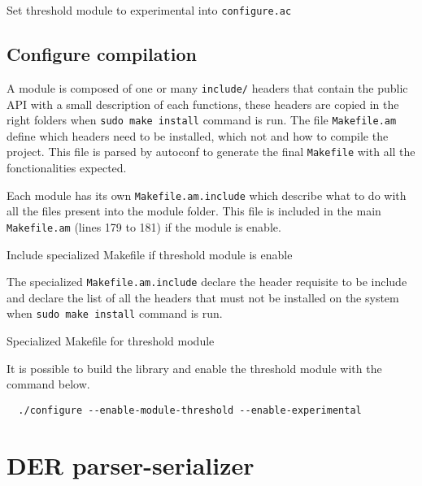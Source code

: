 \begin{listing}
	\caption{Set threshold module to experimental into \texttt{configure.ac}}
	\label{lst:setModuleExperimental}
\end{listing}

\subsection{Configure compilation}

A module is composed of one or many \texttt{include/} headers that
contain the public API with a small description of each functions, these headers
are copied in the right folders when \texttt{sudo make install} command is run.
The file \texttt{Makefile.am} define which headers need to be installed, which
not and how to compile the project. This file is parsed by autoconf to generate
the final \texttt{Makefile} with all the fonctionalities expected.

Each module has its own \texttt{Makefile.am.include} which describe what to do
with all the files present into the module folder. This file is included in the
main \texttt{Makefile.am} (lines 179 to 181) if the module is enable.

\begin{listing}
	\caption{Include specialized Makefile if threshold module is enable}
	\label{lst:includeSpecializedMakefile}
\end{listing}

The specialized \texttt{Makefile.am.include} declare the header requisite to be
include and declare the list of all the headers that must not be installed on
the system when \texttt{sudo make install} command is run.

\begin{listing}
	\caption{Specialized Makefile for threshold module}
	\label{lst:specializedMakefile}
\end{listing}

It is possible to build the library and enable the threshold module with the
command below.

\begin{verbatim}
  ./configure --enable-module-threshold --enable-experimental
\end{verbatim}

\section{DER parser-serializer}
\lipsum[1-2]


